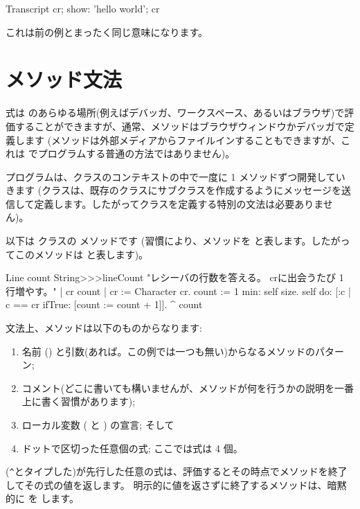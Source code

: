 \documentclass[a4paper,10pt,twoside]{book}
\begin{document}
\begin{code}{}
Transcript cr;
    show: 'hello world';
    cr
\end{code}
これは前の例とまったく同じ意味になります。

\section{メソッド文法}

式は \pharo のあらゆる場所(例えばデバッガ、ワークスペース、あるいはブラウザ)で評価することができますが、通常、メソッドはブラウザウィンドウかデバッガで定義します
(メソッドは外部メディアからファイルインすることもできますが、これは \pharo でプログラムする普通の方法ではありません)。

プログラムは、クラスのコンテキストの中で一度に 1 メソッドずつ開発していきます
(クラスは、既存のクラスにサブクラスを作成するようにメッセージを送信して定義します。したがってクラスを定義する特別の文法は必要ありません)。

以下は  クラスの  メソッドです
(習慣により、メソッドを  と表します。したがってこのメソッドは  と表します)。

\begin{method}[lineCount]{Line count}
String>>>lineCount
   "レシーバの行数を答える。
   crに出会うたび 1 行増やす。"
   | cr count |
   cr := Character cr.
   count := 1 min: self size.
   self do:
      [:c | c == cr ifTrue: [count := count + 1]].
   ^ count
\end{method}

文法上、メソッドは以下のものからなります:
\begin{enumerate}
  \item 名前 (\ie {}) と引数(あれば。この例では一つも無い)からなるメソッドのパターン;
  \item コメント(どこに書いても構いませんが、メソッドが何を行うかの説明を一番上に書く習慣があります);
  \item ローカル変数 (\ie {} と ) の宣言; そして
  \item ドットで区切った任意個の式; ここでは式は 4 個。
\end{enumerate}

\ct{^}(\verb|^|とタイプした)が先行した任意の式は、評価するとその時点でメソッドを終了してその式の値を返します。
明示的に値を返さずに終了するメソッドは、暗黙的に  を します。
\end{document}
